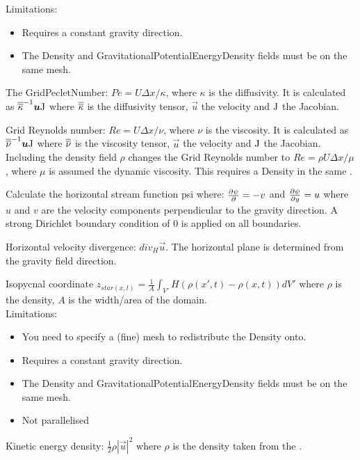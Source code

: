 \begin{description}
	Limitations: \begin{itemize}
	\item Requires a constant gravity direction.
	\item The Density and GravitationalPotentialEnergyDensity fields must be on the same mesh.
	\end{itemize}
\item[GridPecletNumber:]The GridPecletNumber: $Pe = U\Delta x/\kappa$, where $\kappa$ is the diffusivity. It is calculated as $\tensor{\kappa}^{-1}\vec{u}\mat{J}$ where $\tensor{\kappa}$ is the diffusivity tensor, $\vec{u}$ the velocity and $\mat{J}$ the Jacobian.
\item[GridReynoldsNumber:]Grid Reynolds number: $Re = U\Delta x/\nu$, where $\nu$ is the viscosity. It is calculated as $\tensor{\nu}^{-1}\vec{u}\mat{J}$ where $\tensor{\nu}$ is the viscosity tensor, $\vec{u}$ the velocity and $\mat{J}$ the Jacobian. Including the density field $\rho$ changes the Grid Reynolds number to $Re = \rho U\Delta x/\mu$, where $\mu$ is assumed the dynamic viscosity. This requires a Density  in the same .
\item[HorizontalStreamFunction:]Calculate the horizontal stream function psi where:  $\ppx[]{\psi} = -v$ and  $\ppx[y]{\psi}  = u$ where $u$ and $v$ are the velocity components perpendicular to the gravity direction. A strong Dirichlet boundary condition of $0$ is applied on all boundaries.
\item[HorizontalVelocityDivergence:]Horizontal velocity divergence: ${div}_H \vec{u}$. The horizontal plane is determined from the gravity field direction.
\item[IsopycnalCoordinate:]Isopycnal coordinate
	$z_{star(x,t)} = \frac{1}{A} \int_{V'} H(\rho(x',t)-\rho(x,t)) dV'$ where $\rho$ is the density, $A$ is the width/area of the domain. \\
	Limitations:
	\begin{itemize}
	\item You need to specify a (fine) mesh to redistribute the Density onto.
	\item Requires a constant gravity direction.
	\item The Density and GravitationalPotentialEnergyDensity fields must be on the same mesh.
	\item Not parallelised
	\end{itemize}
\item[KineticEnergyDensity:]Kinetic energy density: $\frac{1}{2} \rho |\vec{u}|^2$ where $\rho$ is the density taken from the . \\

\end{description}
